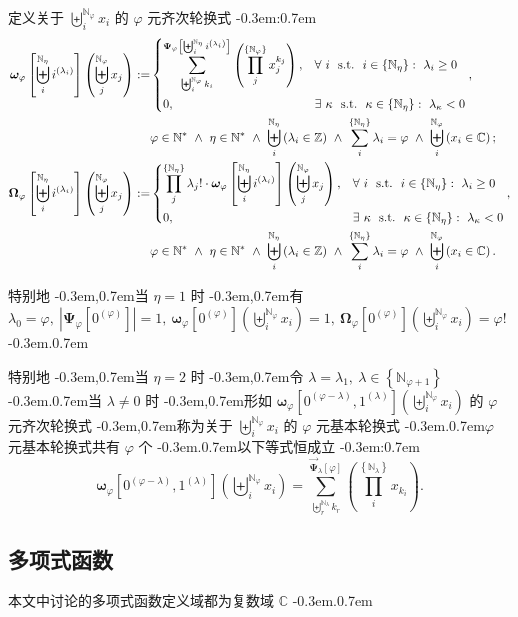 \documentclass{article}
\newcommand\BrSetN[1]{\Set{\MathPartialSetN{#1}}}
\newcommand\InPartialSetN[2]{\InSet{#1}{\BrSetN{#2}}}
\newcommand\InSetC[1]{\InSet{#1}{\MathSetC}}
\newcommand\InSetU[1]{\InSet{#1}{\MathSetU}}
\newcommand\InSetZ[1]{\InSet{#1}{\MathSetZ}}
\newcommand\MathPartialSetN[1]{\mathbb{N}_{#1}}
\newcommand\MathSetC{\mathbb{C}}
\newcommand\MathSetU{\mathbb{N}^{*}}
\newcommand\MathSetZ{\mathbb{Z}}
\newcommand\NormalSeqOfN[3]{\SeqOfN{#1}{#2}{#3_{#1}}}
\newcommand\NormalSumOfN[3]{\SumOfN{#1}{#2}{#3_{#1}}}
\newcommand\ProdOfN[3]{\Prod{#1}{\BrSetN{#2}}{#3}}
\newcommand\SeqOfNInSetC[3]{\SeqOfN{#1}{#2}{\Bracket{\InSetC{#3_{#1}}}}}
\newcommand\SeqOfNInSetZ[3]{\SeqOfN{#1}{#2}{\Bracket{\InSetZ{#3_{#1}}}}}
\newcommand\SeqOfN[3]{\Seq{#1}{\MathPartialSetN{#2}}{#3}}
\newcommand\SumOfN[3]{\Sum{#1}{\BrSetN{#2}}{#3}}
\newcommand\Abs[1]{\left| #1 \right|}
\newcommand\Base[2]{\PowerBracket{0}{#1-#2} \SeqComma \PowerBracket{1}{#2}}
\newcommand\BoldBigOmega[3]{\Func{\BracketMidFunc{\Omega}{#1}{#2}}{\NormalSeqOfN{#3}{#1}{x}}}
\newcommand\BoldBigOmegaSeq{\BoldBigOmega{\varphi}{\SeqLambda}{j}}
\newcommand\BoldOmega[3]{\Func{\BracketMidFunc{\omega}{#1}{#2}}{\NormalSeqOfN{#3}{#1}{x}}}
\newcommand\BoldOmegaBase[2]{\BoldOmega{#1}{\Base{#1}{#2}}{i}}
\newcommand\BoldOmegaSeq{\BoldOmega{\varphi}{\SeqLambda}{j}}
\newcommand\BoldPsi[2]{\BracketMidFunc{\Psi}{#1}{#2}}
\newcommand\BoldPsiVec[2]{\BracketMidFunc{\vec{\Psi}}{#1}{#2}}
\newcommand\Bracket[1]{\left( #1 \right)}
\newcommand\BracketBig[1]{\left\{ #1 \right\}}
\newcommand\BracketMid[1]{\left[ #1 \right]}
\newcommand\BracketMidFunc[3]{\bm{#1}_{#2} \BracketMid{#3}}
\newcommand\CaseDomain[1]{\DomainComma & #1}
\newcommand\Colon{:}
\newcommand\Comma{,}
\newcommand\CommaAnd{\Space{\Comma}}
\newcommand\DefineAs{:=}
\newcommand\DomainAnd{\LogicAnd}
\newcommand\DomainComma{\Comma}
\newcommand\Exists[3]{\Satisfy{\exists}{#1}{#2}{#3}}
\newcommand\ForAll[3]{\Satisfy{\forall}{#1}{#2}{#3}}
\newcommand\Func[2]{#1 \Bracket{#2}}
\newcommand\InSet[2]{#1 \in #2}
\newcommand\Logic[1]{\ #1\ }
\newcommand\LogicAnd{\Logic{\wedge}}
\newcommand\NeqZero[1]{#1 \neq 0}
\newcommand\NumbersSeqLambda{\PowerBracket{i}{\lambda_{i}}}
\newcommand\PowerBracket[2]{#1^{\Bracket{#2}}}
\newcommand\Prod[3]{\prod_{#1}^{#2} #3}
\newcommand\Satisfy[4]{\Space{#1} #2 \SuchThat #3 \Space{\Colon} #4}
\newcommand\Seq[3]{\biguplus_{#1}^{#2} #3}
\newcommand\SeqComma{\Comma}
\newcommand\SeqLambda{\SeqOfN{i}{\eta}{\NumbersSeqLambda}}
\newcommand\SeqX[1]{\NormalSeqOfN{i}{#1}{x}}
\newcommand\Set[1]{\BracketBig{#1}}
\newcommand\Space[1]{#1\ }
\newcommand\SuchThat{\Logic{\Logic{\text{s.t.}}}}
\newcommand\Sum[3]{\sum_{#1}^{#2} #3}
\newcommand\SumPsiSeq[5]{\Sum{\NormalSeqOfN{#1}{#2}{#3}}{\BoldPsi{#2}{#4}}{#5}}
\newcommand\SumPsiVec[5]{\Sum{\NormalSeqOfN{#1}{#2}{#3}}{\BoldPsiVec{#2}{#4}}{#5}}
\newcommand\ZeroSeq[1]{\PowerBracket{0}{#1}}
\newcommand\EqEndPeriod{.}
\newcommand\EqEndSemicolon{;}
\newcommand\TextColon{\TextPunctuation{\Colon}}
\newcommand\TextComma{\TextPunctuation{\Comma}}
\newcommand\TextPeriod{\TextPunctuation{.}}
\newcommand\TextPunctuation[1]{\kern -0.3em#1\kern 0.7em}
\begin{document}
	定义关于 $\SeqX{\varphi}$ 的 $\varphi$ 元齐次轮换式 \TextColon
	\begin{align*}
	\BoldOmegaSeq \DefineAs &
	\begin{dcases}
	\SumPsiSeq{i}{\varphi}{k}{\SeqLambda}{\Bracket{\ProdOfN{j}{\varphi}{x_{j}^{k_{j}}}}} \CaseDomain{\ForAll{i}{\InPartialSetN{i}{\eta}}{\lambda_{i} \geq 0}} \\
	0 \CaseDomain{\Exists{\kappa}{\InPartialSetN{\kappa}{\eta}}{\lambda_{\kappa} < 0}}
	\end{dcases} \DomainComma \\
	& \InSetU{\varphi} \DomainAnd \InSetU{\eta} \DomainAnd \SeqOfNInSetZ{i}{\eta}{\lambda} \DomainAnd \NormalSumOfN{i}{\eta}{\lambda} = \varphi \DomainAnd \SeqOfNInSetC{i}{\varphi}{x} \EqEndSemicolon \\
	\BoldBigOmegaSeq \DefineAs &
	\begin{dcases}
	\ProdOfN{j}{\eta}{\lambda_{j}!} \cdot \BoldOmegaSeq \CaseDomain{\ForAll{i}{\InPartialSetN{i}{\eta}}{\lambda_{i} \geq 0}} \\
	0 \CaseDomain{\Exists{\kappa}{\InPartialSetN{\kappa}{\eta}}{\lambda_{\kappa} < 0}}
	\end{dcases} \DomainComma \\
	& \InSetU{\varphi} \DomainAnd \InSetU{\eta} \DomainAnd \SeqOfNInSetZ{i}{\eta}{\lambda} \DomainAnd \NormalSumOfN{i}{\eta}{\lambda} = \varphi \DomainAnd \SeqOfNInSetC{i}{\varphi}{x} \EqEndPeriod
	\end{align*}
	
	特别地 \TextComma 当 $\eta = 1$ 时 \TextComma 有 $\lambda_{0} = \varphi \CommaAnd \Abs{\BoldPsi{\varphi}{\ZeroSeq{\varphi}}} = 1 \CommaAnd \BoldOmega{\varphi}{\ZeroSeq{\varphi}}{i} = 1 \CommaAnd \BoldBigOmega{\varphi}{\ZeroSeq{\varphi}}{i} = \varphi!$ \TextPeriod
	
	特别地 \TextComma 当 $\eta = 2$ 时 \TextComma 令 $\lambda = \lambda_{1} \CommaAnd \InPartialSetN{\lambda}{\varphi+1}$ \TextPeriod 当 $\NeqZero{\lambda}$ 时 \TextComma 形如 $\BoldOmegaBase{\varphi}{\lambda}$ 的 $\varphi$ 元齐次轮换式 \TextComma 称为关于 $\SeqX{\varphi}$ 的 $\varphi$ 元基本轮换式 \TextPeriod $\varphi$ 元基本轮换式共有 $\varphi$ 个 \TextPeriod 以下等式恒成立 \TextColon
	\begin{equation*}
	\BoldOmegaBase{\varphi}{\lambda} = \SumPsiVec{r}{\lambda}{k}{\varphi}{\Bracket{\ProdOfN{i}{\lambda}{x_{k_{i}}}}} \EqEndPeriod
	\end{equation*}
	
	
	\subsection{多项式函数} \label{sec:2.5}
	本文中讨论的多项式函数定义域都为复数域 $\MathSetC$ \TextPeriod
	
\end{document}
